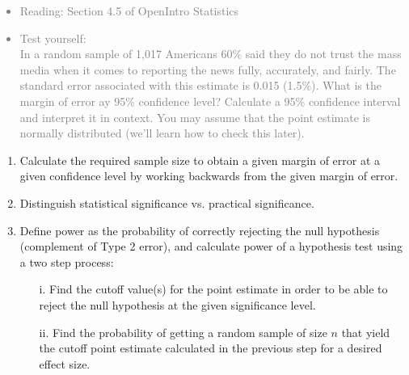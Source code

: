 \documentclass[11pt]{article}
\newcommand{\gray}[1]{\textcolor{gray}{#1}}
\begin{document}
\gray{
{\it
\vspace{-0.5cm}
\begin{itemize}
\renewcommand{\labelitemi}{{\textcolor{dark}{$\ast$}}}
\item Reading: Section 4.5 of OpenIntro Statistics
\item Test yourself: \\
{\small
In a random sample of 1,017 Americans 60\% said they do not trust the mass media when it comes to reporting the news fully, accurately, and fairly. The standard error associated with this estimate is 0.015 (1.5\%). What is the margin of error ay 95\% confidence level? Calculate a 95\% confidence interval and interpret it in context. You may assume that the point estimate is normally distributed (we'll learn how to check this later).
}
\end{itemize}
}}

%

\vspace{0.5cm}

%

\begin{enumerate}[resume]
\renewcommand\labelenumi{\textcolor{light}{\textbf{LO \theenumi.}}}

\item Calculate the required sample size to obtain a given margin of error at a given confidence level by working backwards from the given margin of error.

\item Distinguish statistical significance vs. practical significance.

\item Define power as the probability of correctly rejecting the null hypothesis (complement of Type 2 error), and calculate power of a hypothesis test using a two step process:
\begin{enumerate}
\item[i.] Find the cutoff value(s) for the point estimate in order to be able to reject the null hypothesis at the given significance level.
\item[ii.] Find the probability of getting a random sample of size $n$ that yield the cutoff point estimate calculated in the previous step for a desired effect size.
\end{enumerate}

\end{enumerate}
\end{document}
